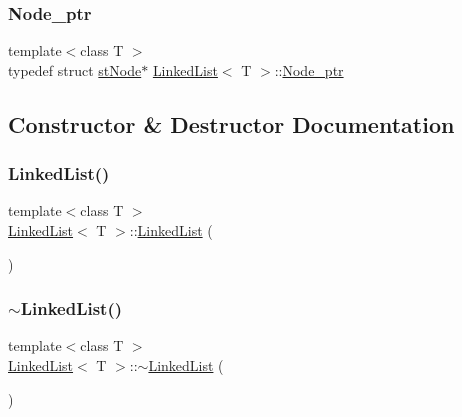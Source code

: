 \mbox{\label{class_linked_list_ab8ae2052461bb438c55fe2786d281850}} 
\subsubsection{\texorpdfstring{Node\+\_\+ptr}{Node\_ptr}}
{\footnotesize\ttfamily template$<$class T $>$ \\
typedef struct \hyperlink{struct_linked_list_1_1st_node}{st\+Node}$\ast$ \hyperlink{class_linked_list}{Linked\+List}$<$ T $>$\+::\hyperlink{class_linked_list_ab8ae2052461bb438c55fe2786d281850}{Node\+\_\+ptr}\hspace{0.3cm}{\ttfamily [protected]}}



\subsection{Constructor \& Destructor Documentation}
\mbox{\label{class_linked_list_a3c20fcfec867e867f541061a09fc640c}} 
\subsubsection{\texorpdfstring{Linked\+List()}{LinkedList()}}
{\footnotesize\ttfamily template$<$class T $>$ \\
\hyperlink{class_linked_list}{Linked\+List}$<$ T $>$\+::\hyperlink{class_linked_list}{Linked\+List} (\begin{DoxyParamCaption}{ }\end{DoxyParamCaption})}

\mbox{\label{class_linked_list_a7c37609df3b83bc4eb0281b852f93fd7}} 
\subsubsection{\texorpdfstring{$\sim$\+Linked\+List()}{~LinkedList()}}
{\footnotesize\ttfamily template$<$class T $>$ \\
\hyperlink{class_linked_list}{Linked\+List}$<$ T $>$\+::$\sim$\hyperlink{class_linked_list}{Linked\+List} (\begin{DoxyParamCaption}{ }\end{DoxyParamCaption})\hspace{0.3cm}{\ttfamily [virtual]}}



